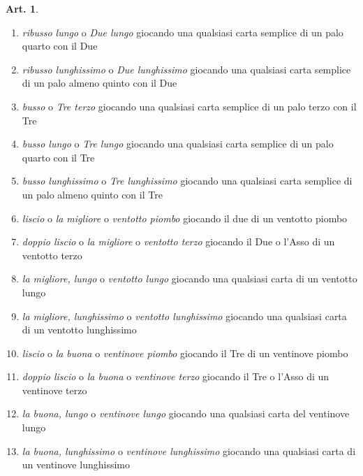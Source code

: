 \documentclass[italian,a4paper]{article}
\theoremstyle{definition}
\newtheorem{art}{Art.}
\begin{document}
\begin{art}
\begin{enumerate}
\item      \emph{ribusso lungo} o \emph{Due lungo} giocando una qualsiasi carta semplice
di un palo quarto con il Due

\item      \emph{ribusso lunghissimo} o \emph{Due lunghissimo} giocando una qualsiasi
carta semplice di un palo almeno quinto con il Due

\item      \emph{busso} o \emph{Tre terzo} giocando una qualsiasi carta semplice di un
palo terzo con il Tre

\item      \emph{busso lungo} o \emph{Tre lungo} giocando una qualsiasi carta semplice di
un palo quarto con il Tre

\item      \emph{busso lunghissimo} o \emph{Tre lunghissimo} giocando una qualsiasi carta
semplice di un palo almeno quinto con il Tre

\item      \emph{liscio} o \emph{la migliore} o \emph{ventotto piombo} giocando il due di un
ventotto piombo

\item      \emph{doppio liscio} o \emph{la migliore} o \emph{ventotto terzo} giocando il Due o
l’Asso di un ventotto terzo

\item      \emph{la migliore, lungo} o \emph{ventotto lungo} giocando una qualsiasi carta
di un ventotto lungo

\item      \emph{la migliore, lunghissimo} o \emph{ventotto lunghissimo} giocando una
qualsiasi carta di un ventotto lunghissimo

\item      \emph{liscio} o \emph{la buona} o \emph{ventinove piombo} giocando il Tre di un
ventinove piombo

\item      \emph{doppio liscio} o \emph{la buona} o \emph{ventinove terzo} giocando il Tre o
l’Asso di un ventinove terzo

\item      \emph{la buona, lungo} o \emph{ventinove lungo} giocando una qualsiasi carta
del ventinove lungo

\item      \emph{la buona, lunghissimo} o \emph{ventinove lunghissimo} giocando una
qualsiasi carta di un ventinove lunghissimo


\end{enumerate}
\end{art}
\end{document}
